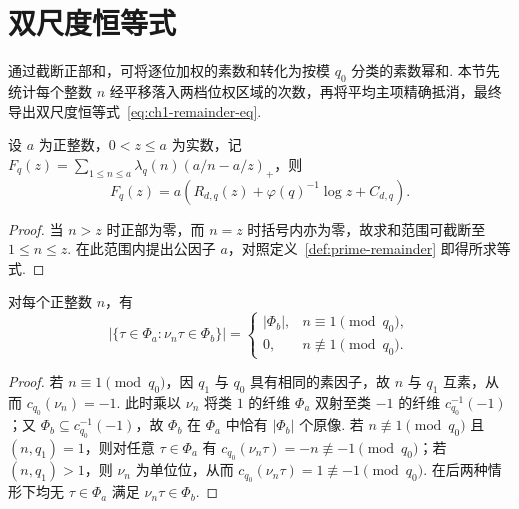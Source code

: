 \section{双尺度恒等式}
\label{sec:two-scale-identity}

通过截断正部和，可将逐位加权的素数和转化为按模 $q_0$ 分类的素数幂和. 本节先统计每个整数 $n$ 经平移落入两档位权区域的次数，再将平均主项精确抵消，最终导出双尺度恒等式~\eqref{eq:ch1-remainder-eq}.

\begin{lemma}[截断正部和]
\label{lem:positive-part-cutoff}
\emitthmsource
设 $a$ 为正整数，$0<z\le a$ 为实数，记
$F_q(z)=\sum_{1\le n\le a}\lambda_q(n)(a/n-a/z)_+$，则
\[
 F_q(z)=a\left(R_{d,q}(z)+\varphi(q)^{-1}\log z+C_{d,q}\right).
\]
\end{lemma}
\begin{proof}
当 $n>z$ 时正部为零，而 $n=z$ 时括号内亦为零，故求和范围可截断至 $1\le n\le z$. 在此范围内提出公因子 $a$，对照定义~\ref{def:prime-remainder} 即得所求等式.
\end{proof}

\begin{lemma}[平移至高权位的计数]
\label{lem:count-weighted-places}
\emitthmsource
对每个正整数 $n$，有
\[
 \bigl|\{\tau\in\Phi_a:\nu_n\tau\in\Phi_b\}\bigr|=
 \begin{cases}
 |\Phi_b|,&n\equiv1\pmod{q_0},\\
 0,&n\not\equiv1\pmod{q_0}.
 \end{cases}
\]
\end{lemma}
\begin{proof}
若 $n\equiv1\pmod{q_0}$，因 $q_1$ 与 $q_0$ 具有相同的素因子，故 $n$ 与 $q_1$ 互素，从而 $c_{q_0}(\nu_n)=-1$. 此时乘以 $\nu_n$ 将类 $1$ 的纤维 $\Phi_a$ 双射至类 $-1$ 的纤维 $c_{q_0}^{-1}(-1)$；又 $\Phi_b\subseteq c_{q_0}^{-1}(-1)$，故 $\Phi_b$ 在 $\Phi_a$ 中恰有 $|\Phi_b|$ 个原像.
若 $n\not\equiv1\pmod{q_0}$ 且 $(n,q_1)=1$，则对任意 $\tau\in\Phi_a$ 有 $c_{q_0}(\nu_n\tau)=-n\not\equiv-1\pmod{q_0}$；若 $(n,q_1)>1$，则 $\nu_n$ 为单位位，从而 $c_{q_0}(\nu_n\tau)=1\not\equiv-1\pmod{q_0}$. 在后两种情形下均无 $\tau\in\Phi_a$ 满足 $\nu_n\tau\in\Phi_b$.
\end{proof}


